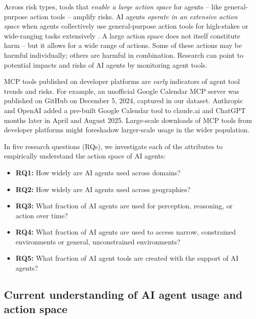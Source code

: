 \documentclass[manuscript,screen,nonacm,oneside]{acmart}
\begin{document}
Across risk types, tools that \textit{enable a large action space} for agents -- like general-purpose action tools -- amplify risks. AI agents \textit{operate in an extensive action space} when agents collectively use general-purpose action tools for high-stakes or wide-ranging tasks extensively \citep{mitchell2025fullyautonomousaiagents}. A large action space does not itself constitute harm -- but it allows for a wide range of actions. Some of these actions may be harmful individually; others are harmful in combination. Research can point to potential impacts and risks of AI agents by monitoring agent tools.

MCP tools published on developer platforms are \emph{early} indicators of agent tool trends and risks. For example, an unofficial Google Calendar MCP server was published on GitHub \citep{githubGitHubMarkelaugust74mcpgooglecalendar} on December 5, 2024, captured in our dataset. Anthropic \citep{Anthropic2025claude} and OpenAI \citep{openaiChatGPTRelease} added a pre-built Google Calendar tool to claude.ai and ChatGPT months later in April and August 2025. Large-scale downloads of MCP tools from developer platforms might foreshadow larger-scale usage in the wider population.

In five research questions (RQs), we investigate each of the attributes to empirically understand the action space of AI agents:
\begin{itemize}
    \item \textbf{RQ1:} How widely are AI agents used across domains?
    \item \textbf{RQ2:} How widely are AI agents used across geographies?
    \item \textbf{RQ3:} What fraction of AI agents are used for perception, reasoning, or action over time?
    \item \textbf{RQ4:} What fraction of AI agents are used to access narrow, constrained environments or general, unconstrained environments?
    \item \textbf{RQ5:} What fraction of AI agent tools are created with the support of AI agents?
\end{itemize}

\subsection{Current understanding of AI agent usage and action space}
\end{document}
